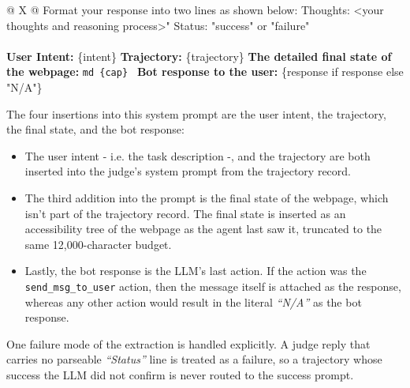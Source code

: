 \begin{table}[htbp]
\begin{tabularx}{\textwidth}{@{} X @{}}
        Format your response into two lines as shown below:
        \newline
        Thoughts: \textless your thoughts and reasoning process\textgreater{}"
        \newline
        Status: "success" or "failure"
        \\
        \midrule
         \\
        \midrule
        \textbf{User Intent:} \{intent\}
        \newline\newline
        \textbf{Trajectory:} \{trajectory\}
        \newline\newline
        \textbf{The detailed final state of the webpage:}
        \texttt{\textasciigrave\textasciigrave\textasciigrave md \{cap\} \textasciigrave\textasciigrave\textasciigrave}
        \newline\newline
        \textbf{Bot response to the user:} \{response if response else "N/A"\}
        \\
        \bottomrule
    \end{tabularx}
\end{table}

The four insertions into this system prompt are the user intent, the trajectory, the final state, and the bot response:
\begin{itemize}
    \item The user intent - i.e. the task description -, and the trajectory are both inserted into the judge's system prompt from the trajectory record.
    \item The third addition into the prompt is the final state of the webpage, which isn't part of the trajectory record. The final state is inserted as an accessibility tree of the webpage as the agent last saw it, truncated to the same 12,000-character budget.
    \item Lastly, the bot response is the LLM's last action. If the action was the \texttt{send\_msg\_to\_user} action, then the message itself is attached as the response, whereas any other action would result in the literal \textit{``N/A''} as the bot response.
\end{itemize}

One failure mode of the extraction is handled explicitly. A judge reply that carries no parseable \textit{``Status''} line is treated as a failure, so a trajectory whose success the LLM did not confirm is never routed to the success prompt.

